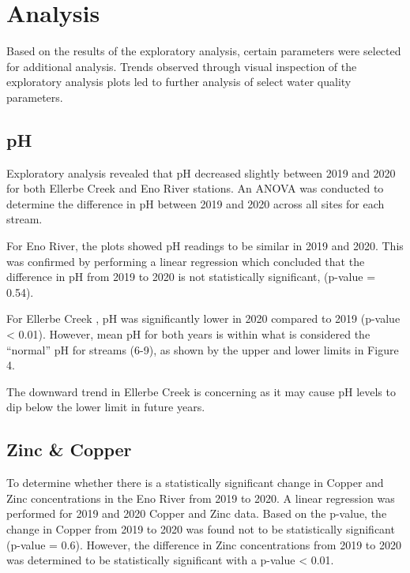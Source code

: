 \documentclass[
  12pt,
]{article}
\begin{document}
\newpage

\hypertarget{analysis}{%
\section{Analysis}\label{analysis}}

Based on the results of the exploratory analysis, certain parameters
were selected for additional analysis. Trends observed through visual
inspection of the exploratory analysis plots led to further analysis of
select water quality parameters.

\hypertarget{ph}{%
\subsection{pH}\label{ph}}

Exploratory analysis revealed that pH decreased slightly between 2019
and 2020 for both Ellerbe Creek and Eno River stations. An ANOVA was
conducted to determine the difference in pH between 2019 and 2020 across
all sites for each stream.

For Eno River, the plots showed pH readings to be similar in 2019 and
2020. This was confirmed by performing a linear regression which
concluded that the difference in pH from 2019 to 2020 is not
statistically significant, (p-value = 0.54).

For Ellerbe Creek , pH was significantly lower in 2020 compared to 2019
(p-value \textless{} 0.01). However, mean pH for both years is within
what is considered the ``normal'' pH for streams (6-9), as shown by the
upper and lower limits in Figure 4.

The downward trend in Ellerbe Creek is concerning as it may cause pH
levels to dip below the lower limit in future years.

\hypertarget{zinc-copper}{%
\subsection{Zinc \& Copper}\label{zinc-copper}}

To determine whether there is a statistically significant change in
Copper and Zinc concentrations in the Eno River from 2019 to 2020. A
linear regression was performed for 2019 and 2020 Copper and Zinc data.
Based on the p-value, the change in Copper from 2019 to 2020 was found
not to be statistically significant (p-value = 0.6). However, the
difference in Zinc concentrations from 2019 to 2020 was determined to be
statistically significant with a p-value \textless{} 0.01.
\end{document}
